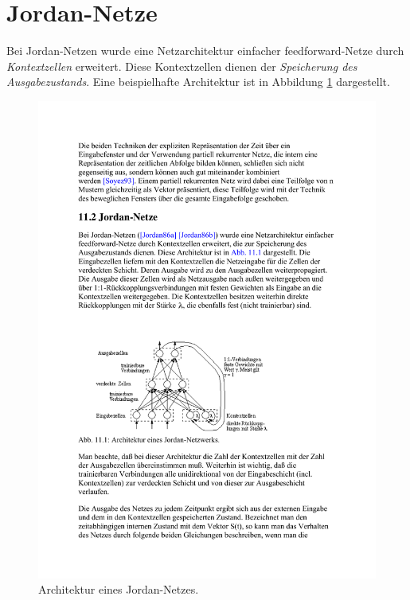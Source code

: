 \section*{Jordan-Netze}
Bei Jordan-Netzen wurde eine Netzarchitektur einfacher feedforward-Netze durch \emph{Kontextzellen} erweitert. Diese Kontextzellen dienen der \emph{Speicherung des Ausgabezustands}.
Eine beispielhafte Architektur ist in Abbildung \ref{fig:ch04_jordan-netze} dargestellt.

\begin{figure}[ht!] \centering 
	\includegraphics[width=\linewidth]{figures/ch04_jordan-netze.pdf}
	\caption{Architektur eines Jordan-Netzes.}
	\label{fig:ch04_jordan-netze}
\end{figure}

